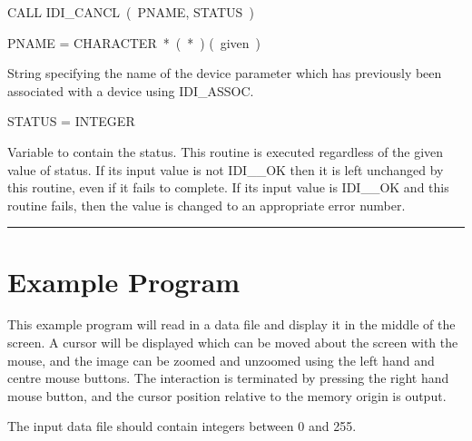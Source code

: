 {\hspace*{10mm}\parbox{140mm}{
CALL IDI\_CANCL~(~PNAME, STATUS~)}

\hspace*{10mm}\parbox{140mm}{
PNAME = CHARACTER~*~(~*~) \hspace{10mm} (~given~)}

\hspace*{30mm}\parbox{120mm}{
String specifying the name of the device parameter which has previously
been associated with a device using IDI\_ASSOC.}

\hspace*{10mm}\parbox{140mm}{
STATUS = INTEGER}

\hspace*{30mm}\parbox{120mm}{
Variable to contain the status. This routine is executed regardless of the
given value of status. If its input value is not IDI\_\_OK then it is left
unchanged by this routine, even if it fails to complete. If its input value
is IDI\_\_OK and this routine fails, then the value is changed to an
appropriate error number.}

\rule{160mm}{0.5mm}
}


\newpage
\section{Example Program}
\label{se:exp}

This example program will read in a data file and display it in the
middle of the screen. A cursor will be displayed which can be
moved about the screen with the mouse, and the image can be zoomed
and unzoomed using the left hand and centre mouse buttons. The
interaction is terminated by pressing the right hand mouse button, and
the cursor position relative to the memory origin is output.

The input data file should contain integers between 0 and 255.

